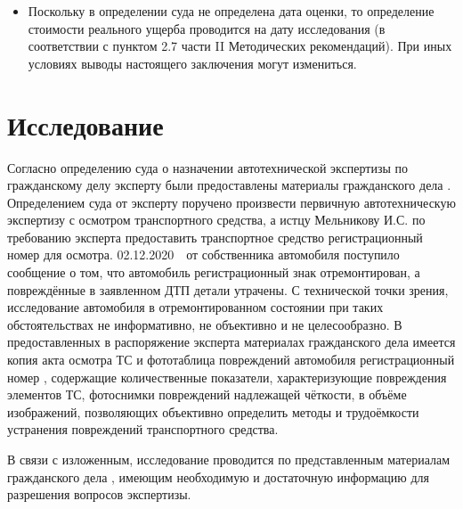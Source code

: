 \begin{itemize}
\item 
	{ Поскольку в определении суда не определена дата оценки, то определение стоимости реального ущерба проводится на дату исследования (в соответствии с пунктом 2.7 части II Методических рекомендаций).
При иных условиях выводы настоящего заключения могут измениться.}

\end{itemize}
%
%
\section{Исследование}
%
Согласно определению суда о назначении автотехнической экспертизы по гражданскому делу \delonum     эксперту  были предоставлены материалы гражданского дела \sud.  Определением суда от \dataopr эксперту поручено  произвести первичную автотехническую экспертизу с осмотром транспортного средства, а истцу Мельникову И.С. по требованию эксперта предоставить транспортное средство  регистрационный номер  для осмотра. 02.12.2020 \,\, от собственника автомобиля поступило сообщение о том, что автомобиль  регистрационный знак  отремонтирован, а повреждённые в заявленном ДТП детали утрачены. С технической точки зрения,  исследование автомобиля в отремонтированном состоянии при таких обстоятельствах  не информативно, не объективно  и не целесообразно. В предоставленных в распоряжение эксперта материалах гражданского дела имеется копия акта осмотра ТС и фототаблица повреждений автомобиля  регистрационный номер , содержащие количественные показатели,  характеризующие повреждения элементов ТС, фотоснимки повреждений  надлежащей чёткости,  в  объёме изображений,  позволяющих объективно определить методы и трудоёмкости устранения повреждений транспортного средства. 

  
 В связи с изложенным,  исследование проводится по  представленным материалам гражданского дела \delonum,  имеющим необходимую и достаточную информацию для разрешения вопросов экспертизы.  

